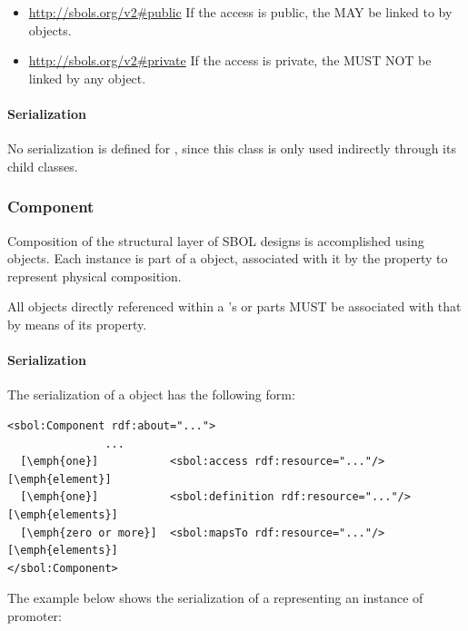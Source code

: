 \begin{itemize}
\item \url{http://sbols.org/v2#public}
  If the access is public, the  MAY be linked to by  objects.

\item \url{http://sbols.org/v2#private}
  If the access is private, the  MUST NOT be linked by any  object.
\end{itemize}

\paragraph{Serialization}

No serialization is defined for , since this class is 
only used indirectly through its child classes.


\subsubsection{Component}
\label{sec:Component}
Composition of the structural layer of SBOL designs is accomplished using  objects. Each  instance is part of a  object, associated with it by the  property to represent  physical composition.  

All  objects directly referenced within a 's  or  parts MUST be associated with that  by means of its  property.

\paragraph{Serialization}

The serialization of a  object has the following form:

\begin{lstlisting}
<sbol:Component rdf:about="...">
               ...
  [\emph{one}]           <sbol:access rdf:resource="..."/> [\emph{element}]
  [\emph{one}]           <sbol:definition rdf:resource="..."/> [\emph{elements}]    
  [\emph{zero or more}]  <sbol:mapsTo rdf:resource="..."/> [\emph{elements}]
</sbol:Component>
\end{lstlisting}

The example below shows the serialization of a 
representing an instance of promoter:


